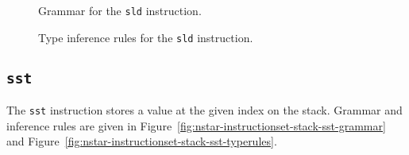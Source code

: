 \begin{figure}[H]
  \centering


  \caption{Grammar for the \texttt{sld} instruction.}
  \label{fig:nstar-instructionset-stack-sld-grammar}
\end{figure}

\begin{figure}[H]
  \centering


  \caption{Type inference rules for the \texttt{sld} instruction.}
  \label{fig:nstar-instructionset-stack-sld-typerules}
\end{figure}

\subsection{\texttt{sst}}\label{subsec:nstar-instructionset-stack-sst}

The \texttt{sst} instruction stores a value at the given index on the stack.
Grammar and inference rules are given in Figure~\ref{fig:nstar-instructionset-stack-sst-grammar} and Figure~\ref{fig:nstar-instructionset-stack-sst-typerules}.

